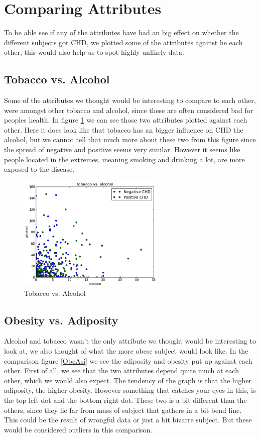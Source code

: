 \section{Comparing Attributes}
To be able see if any of the attributes have had an big effect on whether the different subjects got CHD, we plotted some of the attributes against he each other, this would also help us to spot highly unlikely data.

\subsection{Tobacco vs. Alcohol}

Some of the attributes we thought would be interesting to compare to each other, were amongst other tobacco and alcohol, since these are often considered bad for peoples health. In figure \ref{AlcoTobac} we can see those two attributes plotted against each other. Here it does look like that tobacco has an bigger influence on CHD the alcohol, but we cannot tell that much more about these two from this figure since the spread of negative and positive seems very similar. However it seems like people located in the extremes, meaning smoking and drinking a lot, are more exposed to the disease.

\begin{figure}[H]
\centering
\includegraphics[width=7cm, keepaspectratio=true]{pictures/tobaccoAlcohol.png}
\vspace{-0.4cm}
\caption{\footnotesize Tobacco vs. Alcohol}
\label{AlcoTobac}
\end{figure}

\subsection{Obesity vs. Adiposity}

Alcohol and tobacco wasn't the only attribute we thought would be interesting to look at, we also thought of what the more obese subject would look like. In the comparison figure \ref{ObeAsi} we see the adiposity and obesity put up against each other. First of all, we see that the two attributes depend quite much at each other, which we would also expect. The tendency of the graph is that the higher adiposity, the higher obesity. However something that catches your eyes in this, is the top left dot and the bottom right dot. These two is a bit different than the others, since they lie far from mass of subject that gathers in a bit bend line. This could be the result of wrongful data or just a bit bizarre subject. But these would be considered outliers in this comparison.

